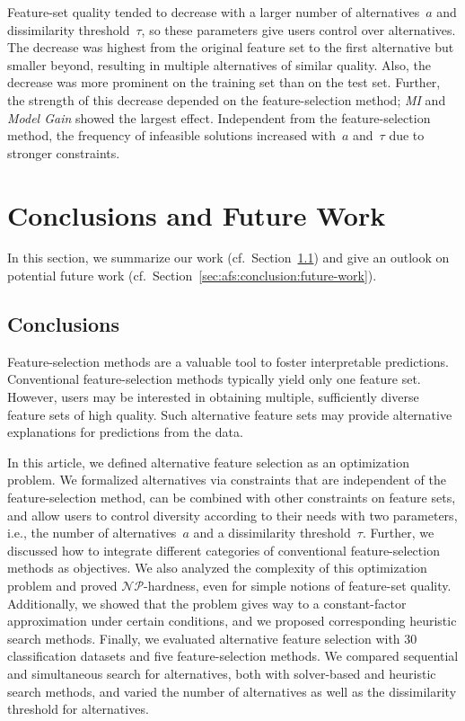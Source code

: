 \documentclass{article}
\theoremstyle{definition}
\begin{document}
Feature-set quality tended to decrease with a larger number of alternatives~$a$ and dissimilarity threshold~$\tau$, so these parameters give users control over alternatives.
The decrease was highest from the original feature set to the first alternative but smaller beyond, resulting in multiple alternatives of similar quality.
Also, the decrease was more prominent on the training set than on the test set.
Further, the strength of this decrease depended on the feature-selection method;
\emph{MI} and \emph{Model Gain} showed the largest effect.
Independent from the feature-selection method, the frequency of infeasible solutions increased with~$a$ and~$\tau$ due to stronger constraints.

\section{Conclusions and Future Work}
\label{sec:afs:conclusion}

In this section, we summarize our work (cf.~Section~\ref{sec:afs:conclusion:conclusion}) and give an outlook on potential future work (cf.~Section~\ref{sec:afs:conclusion:future-work}).

\subsection{Conclusions}
\label{sec:afs:conclusion:conclusion}

Feature-selection methods are a valuable tool to foster interpretable predictions.
Conventional feature-selection methods typically yield only one feature set.
However, users may be interested in obtaining multiple, sufficiently diverse feature sets of high quality.
Such alternative feature sets may provide alternative explanations for predictions from the data.

In this article, we defined alternative feature selection as an optimization problem.
We formalized alternatives via constraints that are independent of the feature-selection method, can be combined with other constraints on feature sets, and allow users to control diversity according to their needs with two parameters, i.e., the number of alternatives~$a$ and a dissimilarity threshold~$\tau$.
Further, we discussed how to integrate different categories of conventional feature-selection methods as objectives.
We also analyzed the complexity of this optimization problem and proved $\mathcal{NP}$-hardness, even for simple notions of feature-set quality.
Additionally, we showed that the problem gives way to a constant-factor approximation under certain conditions, and we proposed corresponding heuristic search methods.
Finally, we evaluated alternative feature selection with 30 classification datasets and five feature-selection methods.
We compared sequential and simultaneous search for alternatives, both with solver-based and heuristic search methods, and varied the number of alternatives as well as the dissimilarity threshold for alternatives.
\end{document}
